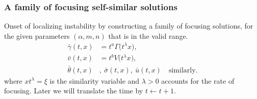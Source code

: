 \documentclass{beamer}
\def\blue{\color{blue}}
\def\bg{{\bar{\gamma}}}
\def\bv{{\bar{v}}}
\def\bth{{\bar{\theta}}}
\def\bs{{\bar{\sigma}}}
\def\bu{{\bar{u}}}
\begin{document}
\begin{frame}
 \frametitle{A family of focusing self-similar solutions}
   Onset of localizing instability by constructing {\blue a family of focusing solutions}, for the given parameters $(\alpha,m,n)$ that is in the valid range.
\begin{equation} \label{intro-sols}
\begin{aligned}
 \bg(t	,x) &= t^a\Gamma\big(t^\lambda x\big), \\
 \bv(t,x) &= t^b V\big(t^\lambda x\big),\\
 \bth(t,x) &,~ \bs(t,x),~ \bu(t,x) \quad \text{similarly}.%
\end{aligned}
\end{equation}
where $xt^{\lambda}=\xi$ is the similarity variable and $\lambda>0$ accounts for the rate of focusing. Later we will translate the time by $t \leftarrow t+1$.
\end{frame}
\end{document}
